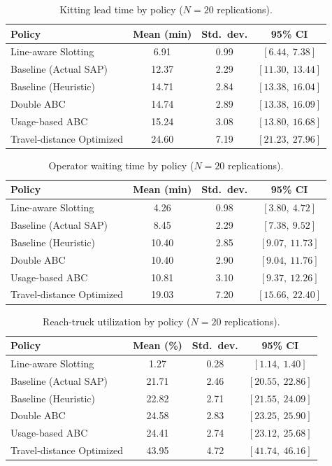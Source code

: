 \documentclass[12pt,a4paper]{article}
\begin{document}
\begin{table}[htbp]
\centering
\caption{Kitting lead time by policy ($N=20$ replications).}
\label{tab:lead}
\begin{tabular}{lccc}
\toprule
Policy & Mean (min) & Std.\ dev. & 95\% CI \\
\midrule
Line-aware Slotting & 6.91 & 0.99 & $[6.44,\ 7.38]$ \\
Baseline (Actual SAP) & 12.37 & 2.29 & $[11.30,\ 13.44]$ \\
Baseline (Heuristic) & 14.71 & 2.84 & $[13.38,\ 16.04]$ \\
Double ABC & 14.74 & 2.89 & $[13.38,\ 16.09]$ \\
Usage-based ABC & 15.24 & 3.08 & $[13.80,\ 16.68]$ \\
Travel-distance Optimized & 24.60 & 7.19 & $[21.23,\ 27.96]$ \\
\bottomrule
\end{tabular}
\end{table}

\begin{table}[htbp]
\centering
\caption{Operator waiting time by policy ($N=20$ replications).}
\label{tab:wait}
\begin{tabular}{lccc}
\toprule
Policy & Mean (min) & Std.\ dev. & 95\% CI \\
\midrule
Line-aware Slotting & 4.26 & 0.98 & $[3.80,\ 4.72]$ \\
Baseline (Actual SAP) & 8.45 & 2.29 & $[7.38,\ 9.52]$ \\
Baseline (Heuristic) & 10.40 & 2.85 & $[9.07,\ 11.73]$ \\
Double ABC & 10.40 & 2.90 & $[9.04,\ 11.76]$ \\
Usage-based ABC & 10.81 & 3.10 & $[9.37,\ 12.26]$ \\
Travel-distance Optimized & 19.03 & 7.20 & $[15.66,\ 22.40]$ \\
\bottomrule
\end{tabular}
\end{table}

\begin{table}[htbp]
\centering
\caption{Reach-truck utilization by policy ($N=20$ replications).}
\label{tab:util}
\begin{tabular}{lccc}
\toprule
Policy & Mean (\%) & Std.\ dev. & 95\% CI \\
\midrule
Line-aware Slotting & 1.27 & 0.28 & $[1.14,\ 1.40]$ \\
Baseline (Actual SAP) & 21.71 & 2.46 & $[20.55,\ 22.86]$ \\
Baseline (Heuristic) & 22.82 & 2.71 & $[21.55,\ 24.09]$ \\
Double ABC & 24.58 & 2.83 & $[23.25,\ 25.90]$ \\
Usage-based ABC & 24.41 & 2.74 & $[23.12,\ 25.68]$ \\
Travel-distance Optimized & 43.95 & 4.72 & $[41.74,\ 46.16]$ \\
\bottomrule
\end{tabular}
\end{table}
\end{document}
